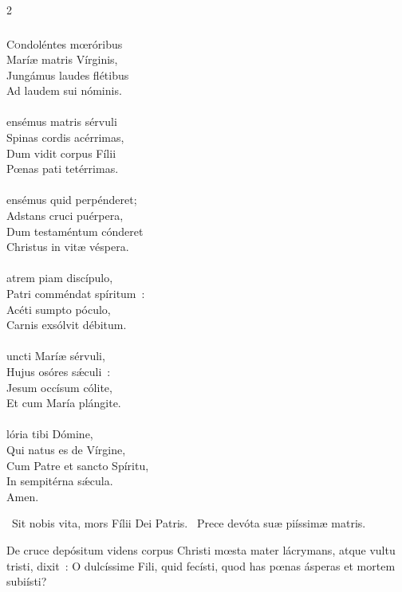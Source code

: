 \documentclass[9pt,twoside]{extarticle}
\begin{document}
\begin{multicols}{2}
{{\subsubsection*{\center {}}
\lettrine{C}ondoléntes mœróribus\\
Maríæ matris Vírginis,\\
Jungámus laudes flétibus\\
Ad laudem sui nóminis.\\
\\
ensémus matris sérvuli\\
Spinas cordis acérrimas,\\
Dum vidit corpus Fílii\\
Pœnas pati tetérrimas.\\
\\
ensémus quid perpénderet;\\
Adstans cruci puérpera,\\
Dum testaméntum cónderet\\
Christus in vitæ véspera.\\
\\
atrem piam discípulo,\\
Patri comméndat spíritum~:\\
Acéti sumpto póculo,\\
Carnis exsólvit débitum.\\
\\
uncti Maríæ sérvuli,\\
Hujus osóres sǽculi~:\\
Jesum occísum cólite,\\
Et cum María plángite.\\
\\
lória tibi Dómine,\\
Qui natus es de Vírgine,\\
Cum Patre et sancto Spíritu,\\
In sempitérna sǽcula.\\
Amen.

\begin{tightlist}{}
\item {}~Sit nobis vita, mors Fílii Dei Patris. ~Prece devóta suæ piíssimæ matris.
\item {} De cruce depósitum videns corpus Christi mœsta mater lácrymans, atque vultu tristi, dixit~: O dulcíssime Fili, quid fecísti, quod has pœnas ásperas et mortem subiísti?
\end{tightlist}

}}
\end{multicols}
\end{document}
